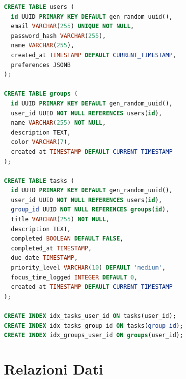 \documentclass[12pt,a4paper]{report}
\begin{document}
\begin{lstlisting}[language=sql]
CREATE TABLE users (
  id UUID PRIMARY KEY DEFAULT gen_random_uuid(),
  email VARCHAR(255) UNIQUE NOT NULL,
  password_hash VARCHAR(255),
  name VARCHAR(255),
  created_at TIMESTAMP DEFAULT CURRENT_TIMESTAMP,
  preferences JSONB
);

CREATE TABLE groups (
  id UUID PRIMARY KEY DEFAULT gen_random_uuid(),
  user_id UUID NOT NULL REFERENCES users(id),
  name VARCHAR(255) NOT NULL,
  description TEXT,
  color VARCHAR(7),
  created_at TIMESTAMP DEFAULT CURRENT_TIMESTAMP
);

CREATE TABLE tasks (
  id UUID PRIMARY KEY DEFAULT gen_random_uuid(),
  user_id UUID NOT NULL REFERENCES users(id),
  group_id UUID NOT NULL REFERENCES groups(id),
  title VARCHAR(255) NOT NULL,
  description TEXT,
  completed BOOLEAN DEFAULT FALSE,
  completed_at TIMESTAMP,
  due_date TIMESTAMP,
  priority_level VARCHAR(10) DEFAULT 'medium',
  focus_time_logged INTEGER DEFAULT 0,
  created_at TIMESTAMP DEFAULT CURRENT_TIMESTAMP
);

CREATE INDEX idx_tasks_user_id ON tasks(user_id);
CREATE INDEX idx_tasks_group_id ON tasks(group_id);
CREATE INDEX idx_groups_user_id ON groups(user_id);
\end{lstlisting}

\section{Relazioni Dati}
\end{document}
